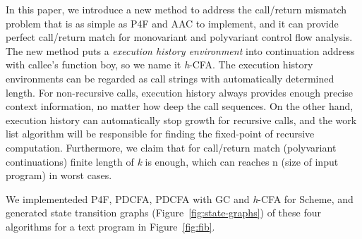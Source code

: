 \documentclass{article}
\begin{document}
In this paper, we introduce a new method to address the call/return mismatch problem that is as simple as P4F and AAC to implement, and it can provide perfect call/return match for monovariant and polyvariant control flow analysis. The new method puts a \emph{execution history environment} into continuation address with callee's function boy, so we name it \textit{h}-CFA\@. The execution history environments can be regarded as call strings with automatically determined length. For non-recursive calls, execution history always provides enough precise context information, no matter how deep the call sequences. On the other hand, execution history can automatically stop growth for recursive calls, and the work list algorithm will be responsible for finding the fixed-point of recursive computation. Furthermore, we claim that for call/return match (polyvariant continuations) finite length of \textit{k} is enough, which can reaches n (size of input program) in worst cases.

We implementeded P4F, PDCFA, PDCFA with GC and \textit{h}-CFA for Scheme, and generated state transition graphs (Figure~\ref{fig:state-graphs}) of these four algorithms for a text program in Figure~\ref{fig:fib}.
\end{document}
